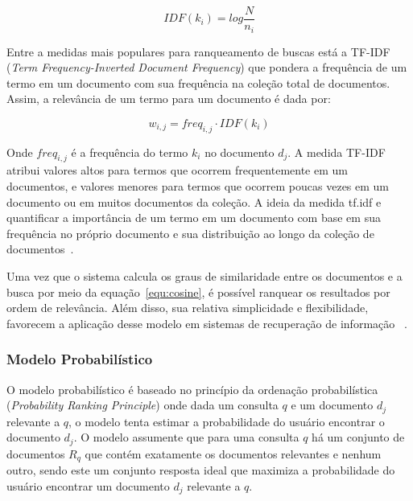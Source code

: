 	\begin{equation}
		IDF(k_i) = log\frac{N}{n_i}
		\label{equ:IDF}
	\end{equation}

Entre a medidas mais populares para ranqueamento de buscas está a TF-IDF (\textit{Term Frequency-Inverted Document Frequency}) que pondera a frequência de um termo em um documento com sua frequência na coleção total de documentos. Assim, a relevância de um termo para um documento é dada por:

\begin{equation}
	w_{i,j} = freq_{i,j} \cdot IDF(k_i)
\end{equation}



Onde $freq_{i,j}$ é a frequência do termo $k_i$ no documento $d_j$. A medida TF-IDF atribui valores altos para termos que ocorrem frequentemente em um documentos, e valores menores para termos que ocorrem poucas vezes em um documento ou em muitos documentos da coleção. A ideia da medida tf.idf e quantificar a importância de um termo em um documento com base em sua frequência no próprio documento e sua distribuição ao longo da coleção de documentos~\cite{Croft2009,Salton1988,Shamsinejadbabki2012,Salton:1994}.


Uma vez que o sistema calcula os graus de similaridade entre os documentos e a busca por meio da equação~\ref{equ:cosine}, é possível ranquear os resultados por ordem de relevância. Além disso, sua relativa simplicidade e flexibilidade, favorecem a aplicação desse modelo em sistemas de recuperação de informação
~\cite{Tan2005,Croft2009,Manning2008}.



\subsubsection{Modelo Probabilístico}

 
O modelo probabilístico é baseado no princípio da ordenação probabilística (\textit{Probability Ranking Principle}) onde dada um consulta $q$ e um documento $d_j$ relevante a $q$, o modelo tenta estimar a probabilidade do usuário encontrar o documento $d_j$. O modelo assumente que para uma consulta $q$ há um conjunto de documentos $R_q$ que contém exatamente os documentos relevantes e nenhum outro, sendo este um conjunto resposta ideal que maximiza a probabilidade do usuário encontrar um documento $d_j$ relevante a $q$. 

